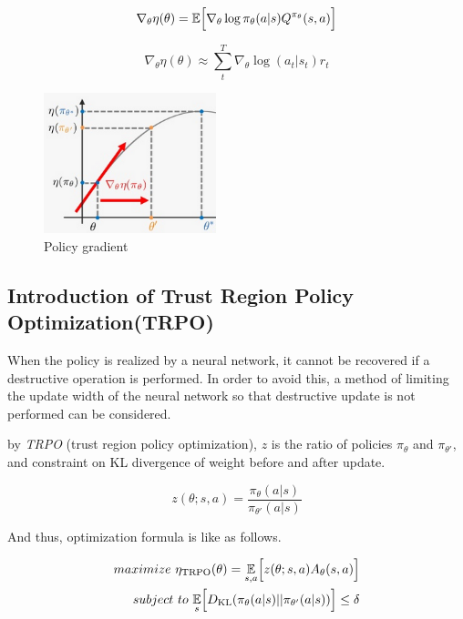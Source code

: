 \[
\nabla_\theta \eta(\theta)=\mathbb{E}\Bigl[ \nabla_\theta \log \pi_\theta(a|s) Q^{\pi_\theta}(s,a)   \Bigr]
\]

\[
\nabla_\theta \eta(\theta) \approx \sum_{t}^{T} \nabla_\theta \log (a_t|s_t)r_t
\]



\begin{figure}[H]
\begin{center}
\includegraphics[width=5cm]{./figures/example_policy_gradient.png}
\caption{Policy gradient}
\label{fig:example_policy_gradient}
\end{center}
\end{figure}


\subsection{Introduction of Trust Region Policy Optimization(TRPO)}

When the policy is realized by a neural network, it cannot be recovered if a destructive operation is performed.
In order to avoid this, a method of limiting the update width of the neural network so that destructive update is not performed can be considered.

by {\it TRPO} (trust region policy optimization), $z$ is the ratio of policies $\pi_\theta$ and $\pi_{\theta'}$, and constraint on KL divergence of weight before and after update.

\[
z(\theta;s,a) = \frac{\pi_{\theta}(a|s)}{\pi_{\theta'}(a|s)}
\]

And thus, optimization formula is like as follows.

\begin{eqnarray*}
maximize ~\eta_{\mathrm{TRPO}}(\theta) = \underset{s,a}{\mathbb{E}}\Bigl[  z(\theta;s,a)A_{\theta}(s,a) \Bigr] \\
subject ~to~  \underset{s}{\mathbb{E}}\Bigl[ D_{\mathrm{KL}}(\pi_{\theta}(a|s)||\pi_{\theta'}(a|s)) \Bigr]  \leq \delta
\end{eqnarray*}


